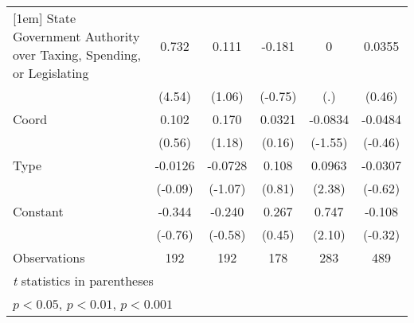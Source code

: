 {\begin{tabular*}{\linewidth}{@{\hskip\tabcolsep\extracolsep\fill}l*{5}{c}}
[1em]
State Government Authority over Taxing, Spending, or Legislating&    0.732\sym{***}&    0.111         &   -0.181         &        0         &   0.0355         \\
                &   (4.54)         &   (1.06)         &  (-0.75)         &      (.)         &   (0.46)         \\
[1em]
Coord           &    0.102         &    0.170         &   0.0321         &  -0.0834         &  -0.0484         \\
                &   (0.56)         &   (1.18)         &   (0.16)         &  (-1.55)         &  (-0.46)         \\
[1em]
Type            &  -0.0126         &  -0.0728         &    0.108         &   0.0963\sym{*}  &  -0.0307         \\
                &  (-0.09)         &  (-1.07)         &   (0.81)         &   (2.38)         &  (-0.62)         \\
[1em]
Constant        &   -0.344         &   -0.240         &    0.267         &    0.747\sym{*}  &   -0.108         \\
                &  (-0.76)         &  (-0.58)         &   (0.45)         &   (2.10)         &  (-0.32)         \\
\hline
Observations    &      192         &      192         &      178         &      283         &      489         \\
\hline\hline
\multicolumn{6}{l}{\footnotesize \textit{t} statistics in parentheses}\\
\multicolumn{6}{l}{\footnotesize \sym{*} \(p<0.05\), \sym{**} \(p<0.01\), \sym{***} \(p<0.001\)}\\
\end{tabular*}
}
